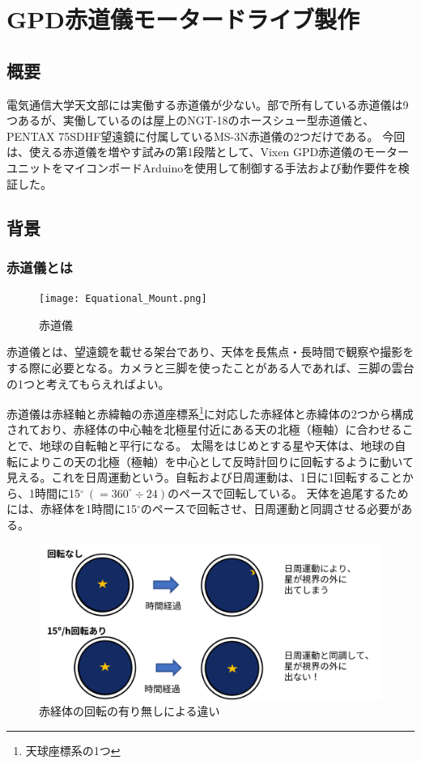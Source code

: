 \documentclass[../../main]{subfiles}
\begin{document}
\chapter{GPD赤道儀モータードライブ製作} %
\section{概要}
電気通信大学天文部には実働する赤道儀が少ない。部で所有している赤道儀は9つあるが、実働しているのは屋上のNGT-18のホースシュー型赤道儀と、PENTAX 75SDHF望遠鏡に付属しているMS-3N赤道儀の2つだけである。
今回は、使える赤道儀を増やす試みの第1段階として、Vixen GPD赤道儀のモーターユニットをマイコンボードArduinoを使用して制御する手法および動作要件を検証した。
\section{背景}
\subsection{赤道儀とは}
\begin{figure}
  \centering
  \texttt{[image: Equational\_Mount.png]}
  \caption{赤道儀}
  \label{fig:Equational_Mount}
\end{figure}
赤道儀とは、望遠鏡を載せる架台であり、天体を長焦点・長時間で観察や撮影をする際に必要となる。カメラと三脚を使ったことがある人であれば、三脚の雲台の1つと考えてもらえればよい。

赤道儀は赤経軸と赤緯軸の赤道座標系\footnote{天球座標系の1つ}に対応した赤経体と赤緯体の2つから構成されており、赤経体の中心軸を北極星付近にある天の北極（極軸）に合わせることで、地球の自転軸と平行になる。
太陽をはじめとする星や天体は、地球の自転によりこの天の北極（極軸）を中心として反時計回りに回転するように動いて見える。これを日周運動という。自転および日周運動は、1日に1回転することから、1時間に15$^\circ~(= 360^\circ \div 24)$のペースで回転している。
天体を追尾するためには、赤経体を1時間に15$^\circ$のペースで回転させ、日周運動と同調させる必要がある。
\begin{figure}
  \centering
  \includegraphics[width=.5\textwidth]{Move-Star.png}
  \caption{赤経体の回転の有り無しによる違い}
  \label{fig:Move-Star}
\end{figure}
\end{document}
